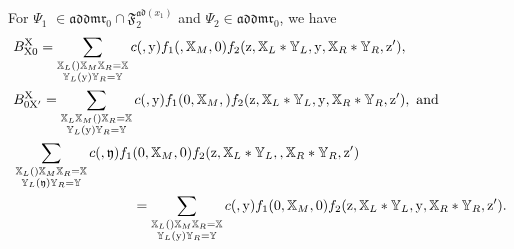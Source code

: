 \documentclass[15pt,oneside,reqno]{amsart}
\theoremstyle{remark}{
\newtheorem{lem}[df]{Lemma}
\newtheorem{prop}[df]{Proposition}
\newtheorem{ex}[df]{Example}
\newtheorem{rmk}[df]{Remark}
}
\newcommand{\ide}[1]{\mathfrak{#1}}
\newcommand{\addmr}{\mathfrak{addmr}}
\newcommand{\ad}{\mathfrak{ad}}
\newcommand{\Fad}{\mathfrak{F}_2^{\ad(x_1)}}
\let\x\relax
\newcommand{\x}{\mathrm{x}}
\newcommand{\y}{\mathrm{y}}
\newcommand{\z}{\mathrm{z}}
\newcommand{\X}{\mathrm{X}}
\begin{document}
\begin{lem}\label{lem:Conv-harmonic}
For $\Psi_1$ $\in \addmr_0 \cap \Fad$ and $\Psi_2\in \addmr_0$, we have\begin{align}
&B_{\X0}^{\X} =  \sum_{\substack{\mathbb{X}_L(\x)\mathbb{X}_M\mathbb{X}_R = \mathbb{X} \\ \mathbb{Y}_L(\y) \mathbb{Y}_R = \mathbb{Y}}} c(\x,\y ) f_1(\x,\mathbb{X}_M, 0)f_2(\z,\mathbb{X}_L * \mathbb{Y}_L , \y, \mathbb{X}_R * \mathbb{Y}_R, \z'), \label{eq:Conv-harmonic-1} \\
&B_{0\X'}^{\X} =  \sum_{\substack{\mathbb{X}_L\mathbb{X}_M(\x)\mathbb{X}_R = \mathbb{X} \\ \mathbb{Y}_L(\y) \mathbb{Y}_R = \mathbb{Y}}} c(\x,\y ) f_1(0,\mathbb{X}_M, \x)f_2(\z,\mathbb{X}_L * \mathbb{Y}_L , \y, \mathbb{X}_R * \mathbb{Y}_R, \z'), \text{ and } \label{eq:Conv-harmonic-2}\\
&\begin{aligned}
 &\sum_{\substack{\mathbb{X}_L(\x)\mathbb{X}_M\mathbb{X}_R = \mathbb{X} \\ \mathbb{Y}_L(\ide{y}) \mathbb{Y}_R = \mathbb{Y}}} c(\x , \ide{y}) f_1(0,\mathbb{X}_M, 0)f_2(\z,\mathbb{X}_L * \mathbb{Y}_L , \x, \mathbb{X}_R * \mathbb{Y}_R, \z')\\
&\hspace{3cm} =  \sum_{\substack{\mathbb{X}_L(\x)\mathbb{X}_M\mathbb{X}_R = \mathbb{X} \\ \mathbb{Y}_L(\y) \mathbb{Y}_R = \mathbb{Y}}} c(\x,\y ) f_1(0,\mathbb{X}_M, 0)f_2(\z,\mathbb{X}_L * \mathbb{Y}_L , \y, \mathbb{X}_R * \mathbb{Y}_R, \z').
\end{aligned}
 \label{eq:Conv-harmonic-3} 
\end{align}



\end{lem}
\end{document}

